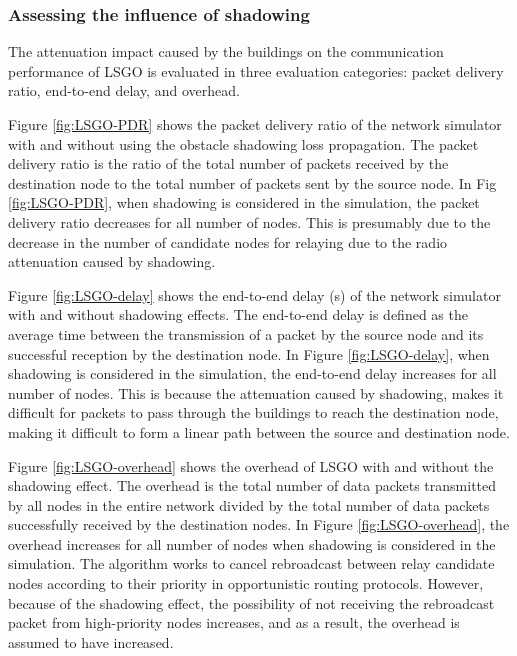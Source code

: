 \documentclass[conference]{IEEEtran}
\begin{document}
\subsubsection{Assessing the influence of shadowing}
The attenuation impact caused by the buildings on the communication performance of LSGO is evaluated in three evaluation categories: packet delivery ratio, end-to-end delay, and overhead.  

Figure \ref{fig:LSGO-PDR} shows the packet delivery ratio of the network simulator with and without using the obstacle shadowing loss propagation. 
The packet delivery ratio is the ratio of the total number of packets received by the destination node to the total number of packets sent by the source node.
In Fig \ref{fig:LSGO-PDR}, when shadowing is considered in the simulation, the packet delivery ratio decreases for all number of nodes. This is presumably due to the decrease in the number of candidate nodes for relaying due to the radio attenuation caused by shadowing.

Figure \ref{fig:LSGO-delay} shows the end-to-end delay (s) of the network simulator with and without shadowing effects. The end-to-end delay is defined as the average time between the transmission of a packet by the source node and its successful reception by the destination node.
In Figure \ref{fig:LSGO-delay}, when shadowing is considered in the simulation, the end-to-end delay increases for all number of nodes. This is because the attenuation caused by shadowing, makes it difficult for packets to pass through the buildings to reach the destination node, making it difficult to form a linear path between the source and destination node.

Figure \ref{fig:LSGO-overhead} shows the overhead of LSGO with and without the shadowing effect. 
The overhead is the total number of data packets transmitted by all nodes in the entire network divided by the total number of data packets successfully received by the destination nodes.
In Figure \ref{fig:LSGO-overhead}, the overhead increases for all number of nodes when shadowing is considered in the simulation.
The algorithm works to cancel rebroadcast between relay candidate nodes according to their priority in opportunistic routing protocols.
However, because of the shadowing effect, the possibility of not receiving the rebroadcast packet from high-priority nodes increases, and as a result, the overhead is assumed to have increased. 
 
\end{document}
